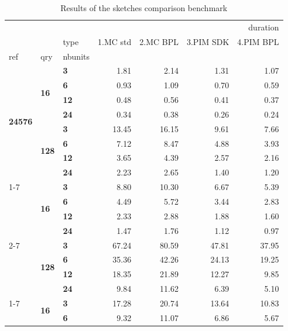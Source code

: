 \begin{table}
\caption{Results of the sketches comparison benchmark}
\label{tab:mash-results}
\begin{tabular}{lll|rr|rr}
\toprule
 &  &  & \multicolumn{4}{r}{duration} \\
 &  & type & 1.MC std & 2.MC BPL & 3.PIM SDK & 4.PIM BPL \\
ref & qry & nbunits &  &  &  &  \\
\midrule
\multirow[t]{8}{*}{\textbf{24576}} & \multirow[t]{4}{*}{\textbf{16}} & \textbf{3} & 1.81 & 2.14 & 1.31 & 1.07 \\
\textbf{} & \textbf{} & \textbf{6} & 0.93 & 1.09 & 0.70 & 0.59 \\
\textbf{} & \textbf{} & \textbf{12} & 0.48 & 0.56 & 0.41 & 0.37 \\
\textbf{} & \textbf{} & \textbf{24} & 0.34 & 0.38 & 0.26 & 0.24 \\
\cline{2-7}
\textbf{} & \multirow[t]{4}{*}{\textbf{128}} & \textbf{3} & 13.45 & 16.15 & 9.61 & 7.66 \\
\textbf{} & \textbf{} & \textbf{6} & 7.12 & 8.47 & 4.88 & 3.93 \\
\textbf{} & \textbf{} & \textbf{12} & 3.65 & 4.39 & 2.57 & 2.16 \\
\textbf{} & \textbf{} & \textbf{24} & 2.23 & 2.65 & 1.40 & 1.20 \\
\cline{1-7} \cline{2-7}
\multirow[t]{8}{*}{\textbf{122880}} & \multirow[t]{4}{*}{\textbf{16}} & \textbf{3} & 8.80 & 10.30 & 6.67 & 5.39 \\
\textbf{} & \textbf{} & \textbf{6} & 4.49 & 5.72 & 3.44 & 2.83 \\
\textbf{} & \textbf{} & \textbf{12} & 2.33 & 2.88 & 1.88 & 1.60 \\
\textbf{} & \textbf{} & \textbf{24} & 1.47 & 1.76 & 1.12 & 0.97 \\
\cline{2-7}
\textbf{} & \multirow[t]{4}{*}{\textbf{128}} & \textbf{3} & 67.24 & 80.59 & 47.81 & 37.95 \\
\textbf{} & \textbf{} & \textbf{6} & 35.36 & 42.26 & 24.13 & 19.25 \\
\textbf{} & \textbf{} & \textbf{12} & 18.35 & 21.89 & 12.27 & 9.85 \\
\textbf{} & \textbf{} & \textbf{24} & 9.84 & 11.62 & 6.39 & 5.10 \\
\cline{1-7} \cline{2-7}
\multirow[t]{8}{*}{\textbf{245760}} & \multirow[t]{4}{*}{\textbf{16}} & \textbf{3} & 17.28 & 20.74 & 13.64 & 10.83 \\
\textbf{} & \textbf{} & \textbf{6} & 9.32 & 11.07 & 6.86 & 5.67 \\

\end{tabular}
\end{table}
